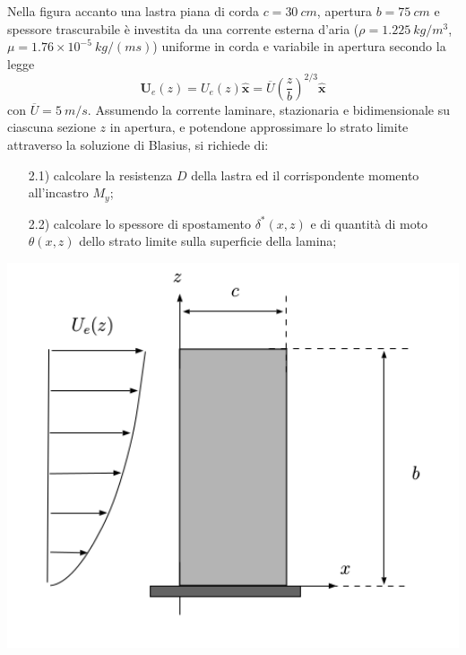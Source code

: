 \begin{minipage}[l]{0.45\textwidth}
 \begin{exerciseS}
  Nella figura accanto una lastra piana di corda $c=30\ cm$, apertura $b=75\ cm$ 
  e spessore trascurabile \`{e} investita da una 
  corrente esterna d'aria ($\rho=1.225\ kg/ m^3$, $\mu=1.76\times10^{-5}\ kg/(ms)$) 
  uniforme in corda e variabile in apertura secondo la legge 
\[
\bm{U}_e(z) = U_e(z) \mathbf{\hat{\bm{x}}} = \overline{U} \left( \frac{z}{b} \right)^{2/3} \mathbf{\hat{\bm{x}}}
\]
con $\overline{U}=5\ m/s$. Assumendo la corrente
  laminare, stazionaria e bidimensionale su ciascuna sezione $z$ in apertura, 
  e potendone approssimare lo strato limite attraverso la soluzione di Blasius, 
  si richiede di:
  \begin{itemize}
   \item[2.1)] calcolare la resistenza $D$ della lastra ed il corrispondente momento 
               all'incastro $M_y$;
           \item[2.2)] calcolare lo spessore di spostamento $\delta^*(x,z)$ e di quantit\`{a} 
               di moto $\theta(x,z)$ dello strato limite sulla superficie della lamina;
  \end{itemize}
 \end{exerciseS}
\end{minipage}
\hspace{3mm}
\begin{minipage}[r]{0.55\textwidth}
  \centering
  \vspace{5mm}
  \includegraphics[width=1.0\textwidth]{./fig/sheet}
\end{minipage}

